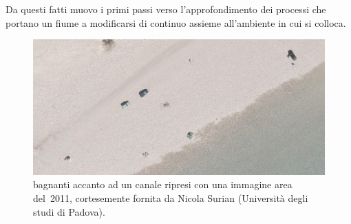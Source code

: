Da questi fatti muovo i primi passi verso l'approfondimento dei processi che portano un fiume a modificarsi di continuo assieme all'ambiente in cui si colloca.


\begin{figure}[hb]
	\centering
	\includegraphics[width=\textwidth]{files/bagnanti.jpeg}
	\caption[bagnanti accanto ad un canale]{bagnanti accanto ad un canale ripresi con una immagine area del~2011, cortesemente fornita da Nicola Surian (Università degli studi di Padova).}
	\label{fig:bagnanti}
\end{figure}


